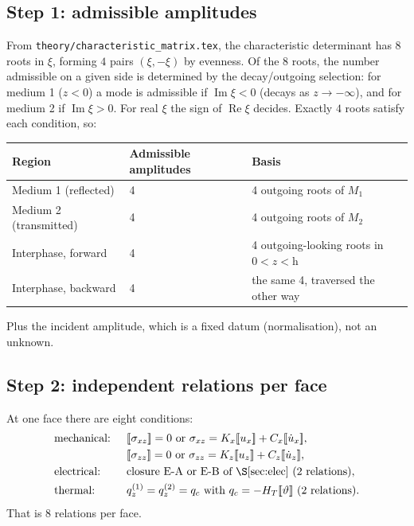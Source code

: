 \documentclass[11pt]{article}
\newcommand{\s}{\sigma}
\newcommand{\bth}{\vartheta}
\newcommand{\jmp}[1]{[\![#1]\!]}
\theoremstyle{plain}
\begin{document}
\subsection{Step 1: admissible amplitudes}

From \texttt{theory/characteristic\_matrix.tex}, the characteristic determinant
has $8$ roots in $\xi$, forming $4$ pairs $(\xi,-\xi)$ by evenness. Of the $8$
roots, the number admissible on a given side is determined by the decay/outgoing
selection: for medium 1 ($z<0$) a mode is admissible if $\operatorname{Im}\xi<0$
(decays as $z\to-\infty$), and for medium 2 if $\operatorname{Im}\xi>0$. For real
$\xi$ the sign of $\operatorname{Re}\xi$ decides. Exactly $4$ roots satisfy each
condition, so:
\begin{center}
\begin{tabular}{lll}
\toprule
Region & Admissible amplitudes & Basis \\
\midrule
Medium 1 (reflected) & 4 & 4 outgoing roots of $M_1$ \\
Medium 2 (transmitted) & 4 & 4 outgoing roots of $M_2$ \\
Interphase, forward & 4 & 4 outgoing-looking roots in $0<z<\mathrm{h}$ \\
Interphase, backward & 4 & the same 4, traversed the other way \\
\bottomrule
\end{tabular}
\end{center}
Plus the incident amplitude, which is a fixed datum (normalisation), not an
unknown.

\subsection{Step 2: independent relations per face}

At one face there are eight conditions:
\begin{equation}
\begin{aligned}
&\text{mechanical: } &&\jmp{\s_{xz}}=0 \text{ or } \s_{xz}=K_x\jmp{u_x}+C_x\jmp{\dot u_x}, \\
& &&\jmp{\s_{zz}}=0 \text{ or } \s_{zz}=K_z\jmp{u_z}+C_z\jmp{\dot u_z}, \\
&\text{electrical: } &&\text{closure E-A or E-B of \S\ref{sec:elec} (2 relations)}, \\
&\text{thermal: } &&q_z^{(1)}=q_z^{(2)}=q_c \text{ with } q_c=-H_T\jmp{\bth} \text{ (2 relations)}.
\end{aligned}
\label{eq:eight}
\end{equation}
That is $8$ relations per face.
\end{document}
